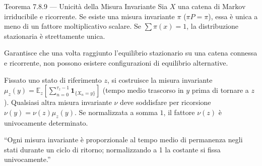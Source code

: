 \documentclass[11pt,a4paper]{report}
\begin{document}
\begin{teoremabox}{Teorema 7.8.9 --- Unicità della Misura Invariante}
Sia $X$ una catena di Markov irriducibile e ricorrente. Se esiste una misura invariante $\pi$ ($\pi P = \pi$), essa è unica a meno di un fattore moltiplicativo scalare. Se $\sum \pi(x) = 1$, la distribuzione stazionaria è strettamente unica.

\begin{cosafa}
Garantisce che una volta raggiunto l'equilibrio stazionario su una catena connessa e ricorrente, non possono esistere configurazioni di equilibrio alternative.
\end{cosafa}

\begin{dimostrazione}
Fissato uno stato di riferimento $z$, si costruisce la misura invariante $\mu_z(y) = \mathbb{E}_z\left[\sum_{n=0}^{\tau_z-1} \mathbf{1}_{\{X_n=y\}}\right]$ (tempo medio trascorso in $y$ prima di tornare a $z$). Qualsiasi altra misura invariante $\nu$ deve soddisfare per ricorsione $\nu(y) = \nu(z) \mu_z(y)$. Se normalizzata a somma $1$, il fattore $\nu(z)$ è univocamente determinato.
\end{dimostrazione}

\begin{oralbox}
``Ogni misura invariante è proporzionale al tempo medio di permanenza negli stati durante un ciclo di ritorno; normalizzando a 1 la costante si fissa univocamente.''
\end{oralbox}
\end{teoremabox}

\newpage
\end{document}
